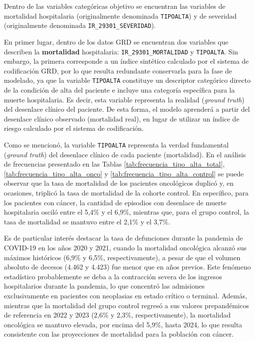 Dentro de las variables categóricas objetivo se encuentran las variables de mortalidad hospitalaria (originalmente denominada \texttt{TIPOALTA}) y de severidad (originalmente denominada \texttt{IR\_29301\_SEVERIDAD}).

En primer lugar, dentro de los datos GRD se encuentran dos variables que describen la \textbf{mortalidad} hospitalaria: \texttt{IR\_29301\_MORTALIDAD} y \texttt{TIPOALTA}. Sin embargo, la primera corresponde a un índice sintético calculado por el sistema de codificación GRD, por lo que resulta redundante conservarla para la fase de modelado, ya que la variable \texttt{TIPOALTA} constituye un descriptor categórico directo de la condición de alta del paciente e incluye una categoría específica para la muerte hospitalaria. Es decir, esta variable representa la realidad (\textit{ground truth}) del desenlace clínico del paciente. De esta forma, el modelo aprenderá a partir del desenlace clínico observado (mortalidad real), en lugar de utilizar un índice de riesgo calculado por el sistema de codificación.

Como se mencionó, la variable \texttt{TIPOALTA} representa la verdad fundamental (\textit{ground truth}) del desenlace clínico de cada paciente (mortalidad). En el análisis de frecuencias presentado en las Tablas \ref{tab:frecuencia_tipo_alta_total}, \ref{tab:frecuencia_tipo_alta_onco} y \ref{tab:frecuencia_tipo_alta_control} se puede observar que la tasa de mortalidad de los pacientes oncológicos duplicó y, en ocasiones, triplicó la tasa de mortalidad de la cohorte control. En específico, para los pacientes con cáncer, la cantidad de episodios con desenlace de muerte hospitalaria osciló entre el 5,4\% y el 6,9\%, mientras que, para el grupo control, la tasa de mortalidad se mantuvo entre el 2,1\% y el 3,7\%.

Es de particular interés destacar la tasa de defunciones durante la pandemia de COVID-19 en los años 2020 y 2021, cuando la mortalidad oncológica alcanzó sus máximos históricos (6,9\% y 6,5\%, respectivamente), a pesar de que el volumen absoluto de decesos (4.462 y 4.423) fue menor que en años previos. Este fenómeno estadístico probablemente se deba a la contracción severa de los ingresos hospitalarios durante la pandemia, lo que concentró las admisiones exclusivamente en pacientes con neoplasias en estado crítico o terminal. Además, mientras que la mortalidad del grupo control regresó a sus valores prepandémicos de referencia en 2022 y 2023 (2,6\% y 2,3\%, respectivamente), la mortalidad oncológica se mantuvo elevada, por encima del 5,9\%, hasta 2024, lo que resulta consistente con las proyecciones de mortalidad para la población con cáncer.

